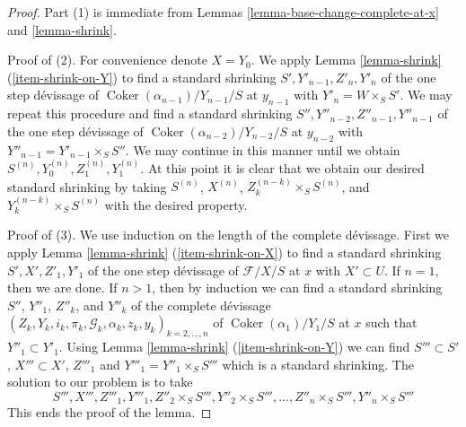 \documentclass[10pt,a4paper]{amsart}
\theoremstyle{plain}
\theoremstyle{definition}
\theoremstyle{remark}
\numberwithin{equation}{subsection}
\def\Coker{\mathop{\mathrm{Coker}}}
\begin{document}
\begin{proof}
Part (1) is immediate from
Lemmas \ref{lemma-base-change-complete-at-x} and
\ref{lemma-shrink}.

\medskip\noindent
Proof of (2). For convenience denote $X = Y_0$. We apply
Lemma \ref{lemma-shrink} (\ref{item-shrink-on-Y})
to find a standard shrinking
$S', Y'_{n - 1}, Z'_n, Y'_n$
of the one step d\'evissage of $\Coker(\alpha_{n - 1})/Y_{n - 1}/S$
at $y_{n - 1}$ with $Y'_n = W \times_S S'$. We may repeat this procedure
and find a standard shrinking
$S'', Y''_{n - 2}, Z''_{n - 1}, Y''_{n - 1}$
of the one step d\'evissage of $\Coker(\alpha_{n - 2})/Y_{n - 2}/S$
at $y_{n - 2}$ with $Y''_{n - 1} = Y'_{n - 1} \times_S S''$.
We may continue in this manner until we obtain
$S^{(n)}, Y^{(n)}_0, Z^{(n)}_1, Y^{(n)}_1$.
At this point it is clear that we obtain our desired standard shrinking
by taking $S^{(n)}$, $X^{(n)}$, $Z_k^{(n - k)} \times_S S^{(n)}$, and
$Y_k^{(n - k)} \times_S S^{(n)}$ with the desired property.

\medskip\noindent
Proof of (3). We use induction on the length of the complete
d\'evissage. First we apply
Lemma \ref{lemma-shrink} (\ref{item-shrink-on-X})
to find a standard shrinking
$S', X', Z'_1, Y'_1$
of the one step d\'evissage of $\mathcal{F}/X/S$ at $x$
with $X' \subset U$. If $n = 1$, then we are done.
If $n > 1$, then by induction we can find a standard shrinking
$S''$, $Y''_1$, $Z''_k$, and $Y''_k$ of the complete d\'evissage
$(Z_k, Y_k, i_k, \pi_k, \mathcal{G}_k, \alpha_k, z_k, y_k)_{k = 2, \ldots, n}$
of $\Coker(\alpha_1)/Y_1/S$ at $x$ such that
$Y''_1 \subset Y'_1$. Using
Lemma \ref{lemma-shrink} (\ref{item-shrink-on-Y})
we can find $S''' \subset S'$, $X''' \subset X'$, $Z'''_1$ and
$Y'''_1 = Y''_1 \times_S S'''$ which is a standard shrinking.
The solution to our problem is to take
$$
S''', X''', Z'''_1, Y'''_1, Z''_2 \times_S S''',
Y''_2 \times_S S''', \ldots, Z''_n \times_S S''', Y''_n \times_S S'''
$$
This ends the proof of the lemma.
\end{proof}
\end{document}
